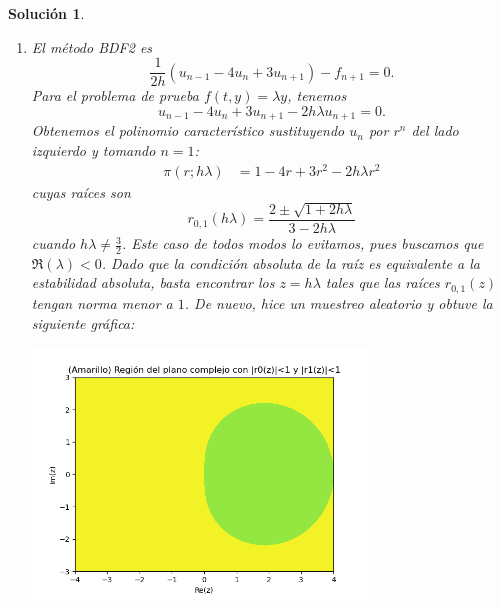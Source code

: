 \documentclass[11pt]{article}
\newtheorem*{sol}{Solución}
\begin{document}
\begin{sol}
\begin{enumerate}
    \item
      El método BDF2 es
      \begin{equation}
        \frac{1}{2h}(u_{n-1} - 4 u_n + 3 u_{n+1}) - f_{n+1} = 0
      .\end{equation}
      Para el problema de prueba $f(t,y)=\lambda y$, tenemos
      \begin{equation}
        u_{n-1} - 4 u_n + 3 u_{n+1} - 2h\lambda u_{n+1} = 0
      .\end{equation}
      Obtenemos el polinomio característico sustituyendo $u_n$ por
      $r^{n}$ del lado izquierdo y tomando $n=1$:
      \begin{align}
        \pi(r;h\lambda)
        &= 1 - 4 r + 3 r^{2} - 2h\lambda r^{2}
      \end{align}
      cuyas raíces son
      \begin{equation}
        r_{0,1}(h\lambda) = \frac{2\pm\sqrt{1+2h\lambda}}{3-2h\lambda}
      \end{equation}
      cuando $h\lambda \neq \frac{3}{2}$.
      Este caso de todos modos lo evitamos, pues buscamos que
      $\Re(\lambda)<0$.
      Dado que la condición absoluta de la raíz es equivalente a la
      estabilidad absoluta, basta encontrar los $z=h\lambda$ tales
      que las raíces $r_{0,1}(z)$ tengan norma menor a $1$.
      De nuevo, hice un muestreo aleatorio y obtuve la siguiente
      gráfica:
      \begin{center}
        \includegraphics[width=0.7\textwidth]
        {img/jaac_tarea2_ejercicio2b.png}
      \end{center}

  \end{enumerate}
\end{sol}
\end{document}
